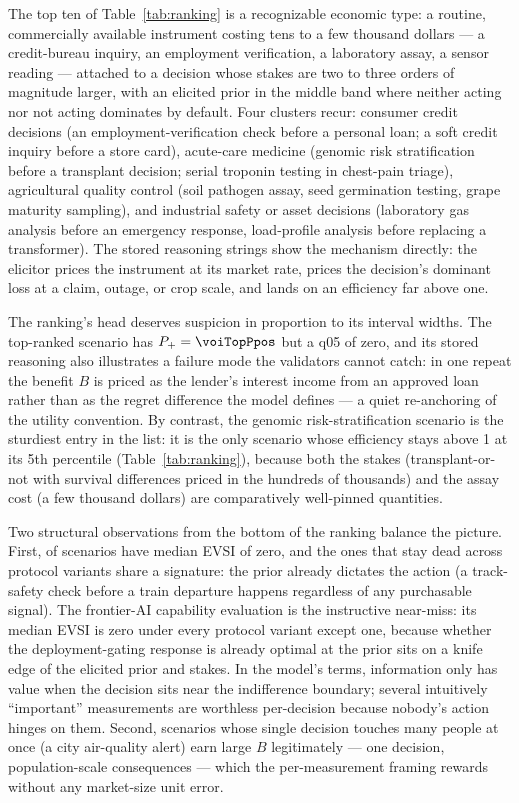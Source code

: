 
The top ten of Table~\ref{tab:ranking} is a recognizable economic type: a
routine, commercially available instrument costing tens to a few thousand
dollars --- a credit-bureau inquiry, an employment verification, a laboratory
assay, a sensor reading --- attached to a decision whose stakes are two to
three orders of magnitude larger, with an elicited prior in the middle band
where neither acting nor not acting dominates by default. Four clusters
recur: consumer credit decisions (an employment-verification check before a
personal loan; a soft credit inquiry before a store card), acute-care
medicine (genomic risk stratification before a transplant decision; serial
troponin testing in chest-pain triage), agricultural quality control (soil
pathogen assay, seed germination testing, grape maturity sampling), and
industrial safety or asset decisions (laboratory gas analysis before an
emergency response, load-profile analysis before replacing a transformer).
The stored reasoning strings show the mechanism directly: the elicitor prices
the instrument at its market rate, prices the decision's dominant loss at a
claim, outage, or crop scale, and lands on an efficiency far above one.

The ranking's head deserves suspicion in proportion to its interval widths.
The top-ranked scenario has $P_+ = \voiTopPpos$ but a q05 of zero, and its
stored reasoning also illustrates a failure mode the validators cannot catch:
in one repeat the benefit $B$ is priced as the lender's interest income from
an approved loan rather than as the regret difference the model defines ---
a quiet re-anchoring of the utility convention. By contrast, the genomic
risk-stratification scenario is the sturdiest entry in the list: it is the
only scenario whose efficiency stays above 1 at its 5th percentile
(Table~\ref{tab:ranking}), because both the stakes (transplant-or-not with
survival differences priced in the hundreds of thousands) and the assay cost
(a few thousand dollars) are comparatively well-pinned quantities.

Two structural observations from the bottom of the ranking balance the
picture. First, \voiZeroEvsiCount{} of \voiNRanked{} scenarios have median
EVSI of zero, and the ones that stay dead across protocol variants share a
signature: the prior already dictates the action (a track-safety check before
a train departure happens regardless of any purchasable signal). The
frontier-AI capability evaluation is the instructive near-miss: its median
EVSI is zero under every protocol variant except one, because whether the
deployment-gating response is already optimal at the prior sits on a knife
edge of the elicited prior and stakes. In the model's terms, information only
has value when the decision sits near the indifference boundary; several
intuitively ``important'' measurements are worthless per-decision because
nobody's action hinges on them. Second, scenarios whose single decision touches many people
at once (a city air-quality alert) earn large $B$ legitimately --- one
decision, population-scale consequences --- which the per-measurement framing
rewards without any market-size unit error.
